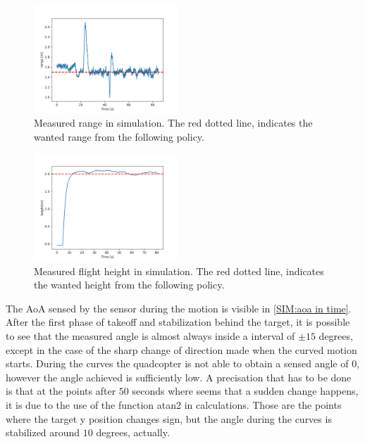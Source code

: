 \begin{figure}
    \centering
    \includegraphics[width=0.48\textwidth]{images/Simulation/Range measures.png}
    \caption{Measured range in simulation. The red dotted line, indicates the wanted range from the following policy.}
    \label{SIM:range in time}
\end{figure}

\begin{figure}
    \centering
    \includegraphics[width=0.48\textwidth]{images/Simulation/height_from_px4.png}
    \caption{Measured flight height in simulation. The red dotted line, indicates the wanted height from the following policy.}
    \label{SIM:height in time}
\end{figure}

The AoA sensed by the sensor during the motion is visible in \autoref{SIM:aoa in time}. After the first phase of takeoff and stabilization behind the target, it is possible to see that the measured angle is almost always inside a interval of $\pm 15$ degrees, except in the case of the sharp change of direction made when the curved motion starts. During the curves the quadcopter is not able to obtain a sensed angle of $0$, however the angle achieved is sufficiently low. A precisation that has to be done is that at the points after $50$ seconds where seems that a sudden change happens, it is due to the use of the function atan2 in calculations. Those are the points where the target y position changes sign, but the angle during the curves is stabilized around $10$ degrees, actually. \\

